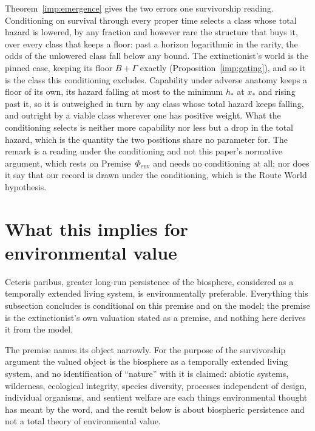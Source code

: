 \begin{remark}\label{hr:rem:emergence}
Theorem~\ref{imp:emergence} gives the two errors one survivorship
reading. Conditioning on survival through every proper time selects a
class whose total hazard is lowered, by any fraction and however rare
the structure that buys it, over every class that keeps a floor: past a
horizon logarithmic in the rarity, the odds of the unlowered class fall
below any bound. The extinctionist's world is the pinned case, keeping
its floor $B+\Gamma$ exactly (Proposition~\ref{imp:gating}), and so it
is the class this conditioning excludes. Capability under adverse
anatomy keeps a floor of its own, its hazard falling at most to the
minimum $h_\ast$ at $x_\ast$ and rising past it, so it is outweighed in
turn by any class whose total hazard keeps falling, and outright by a
viable class wherever one has positive weight. What the
conditioning selects is neither more capability nor less but a drop in
the total hazard, which is the quantity the two positions share no
parameter for. The remark is a reading under the conditioning and not
this paper's normative argument, which rests on
Premise~$\Phi_{\mathrm{env}}$ and needs no conditioning at all; nor does
it say that our record is drawn under the conditioning, which is the
Route World hypothesis.
\end{remark}


\section{What this implies for environmental value}\label{sec:environment}

\label{hr:sub:environment}

\begin{premise}\label{hr:prem:env}
Ceteris paribus, greater long-run persistence of the biosphere,
considered as a temporally extended living system, is environmentally
preferable. Everything this subsection concludes is conditional on this
premise and on the model; the premise is the extinctionist's own
valuation stated as a premise, and nothing here derives it from the
model.
\end{premise}

\noindent The premise names its object narrowly. For the purpose of the
survivorship argument the valued object is the biosphere as a
temporally extended living system, and no identification of ``nature''
with it is claimed: abiotic systems, wilderness, ecological integrity,
species diversity, processes independent of design, individual
organisms, and sentient welfare are each things environmental thought
has meant by the word, and the result below is about biospheric
persistence and not a total theory of environmental value.

